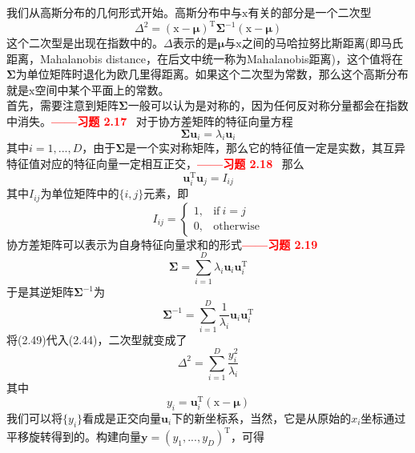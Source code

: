 \documentclass[b5paper]{book}
\numberwithin{equation}{chapter}
\newcommand {\bx} {\boldsymbol{\mathrm{x}}}
\newcommand {\rmT} {\mathrm{T}}
\newcommand {\bfMu} {\boldsymbol{\mu}}
\newcommand {\bfSigma} {\boldsymbol{\Sigma}}
\begin{document}
{	\indent 我们从高斯分布的几何形式开始。高斯分布中与$\bx$有关的部分是一个二次型
	\begin{equation}
		\Delta^2=(\bx-\bfMu)^{\rmT}\bfSigma^{-1}(\bx-\bfMu)
	\end{equation}
	这个二次型是出现在指数中的。$\Delta$表示的是$\bfMu$与$\bx$之间的马哈拉努比斯距离(即马氏距离，Mahalanobis distance，在后文中统一称为Mahalanobis距离)，这个值将在$\bfSigma$为单位矩阵时退化为欧几里得距离。如果这个二次型为常数，那么这个高斯分布就是$\bx$空间中某个平面上的常数。\\
	\indent 首先，需要注意到矩阵$\bfSigma$一般可以认为是对称的，因为任何反对称分量都会在指数中消失。\textcolor{red}{\textbf{——习题 2.17} \ }对于协方差矩阵的特征向量方程
	\begin{equation}
		\bfSigma \mathbf{u}_i = \lambda_i \mathbf{u}_i
	\end{equation}
	其中$i=1,...,D$，由于$\bfSigma$是一个实对称矩阵，那么它的特征值一定是实数，其互异特征值对应的特征向量一定相互正交，\textcolor{red}{\textbf{——习题 2.18} \ }那么
	\begin{equation}
		\mathbf{u}_i^{\rmT} \mathbf{u}_j = I_{ij}
	\end{equation}
	其中$I_{ij}$为单位矩阵中的$\{i,j\}$元素，即
	\begin{equation}
		I_{ij}=\begin{cases}
		1,&\text{if}\ i=j \\
		0,&\text{otherwise}
		\end{cases}
	\end{equation}
	协方差矩阵可以表示为自身特征向量求和的形式\textcolor{red}{\textbf{——习题 2.19} \ }
	\begin{equation}
		\bfSigma=\sum_{i=1}^D\lambda_i\mathbf{u}_i\mathbf{u}_i^{\rmT}
	\end{equation}
	于是其逆矩阵$\bfSigma^{-1}$为
	\begin{equation}
		\bfSigma^{-1}=\sum_{i=1}^D\frac{1}{\lambda_i}\mathbf{u}_i\mathbf{u}_i^{\rmT}
	\end{equation}
	将(2.49)代入(2.44)，二次型就变成了
	\begin{equation}
		\Delta^2=\sum_{i=1}^D\frac{y_i^2}{\lambda_i}
	\end{equation}
	其中
	\begin{equation}
		y_i=\mathbf{u}_i^{\rmT}(\bx - \bfMu)
	\end{equation}
	我们可以将$\{y_i\}$看成是正交向量$\mathbf{u}_i$下的新坐标系，当然，它是从原始的$x_i$坐标通过平移旋转得到的。构建向量$\mathbf{y}=(y_1,...,y_D)^{\rmT}$，可得
	\begin{equation}

\end{equation}}
\end{document}
